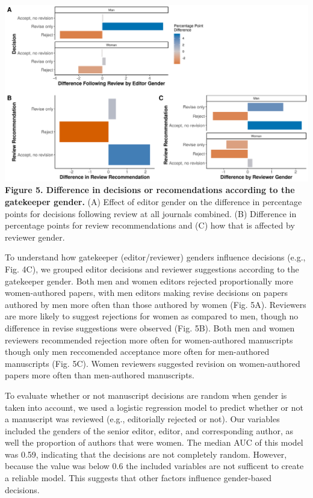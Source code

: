 \documentclass[11pt,]{article}
\begin{document}
\includegraphics{Figure_5.png} \textbf{Figure 5. Difference in decisions
or recomendations according to the gatekeeper gender.} (A) Effect of
editor gender on the difference in percentage points for decisions
following review at all journals combined. (B) Difference in percentage
points for review recommendations and (C) how that is affected by
reviewer gender.

To understand how gatekeeper (editor/reviewer) genders influence
decisions (e.g., Fig. 4C), we grouped editor decisions and reviewer
suggestions according to the gatekeeper gender. Both men and women
editors rejected proportionally more women-authored papers, with men
editors making revise decisions on papers authored by men more often
than those authored by women (Fig. 5A). Reviewers are more likely to
suggest rejections for women as compared to men, though no difference in
revise suggestions were observed (Fig. 5B). Both men and women reviewers
recommended rejection more often for women-authored manuscripts though
only men reccomended acceptance more often for men-authored manuscripts
(Fig. 5C). Women reviewers suggested revision on women-authored papers
more often than men-authored manuscripts.

To evaluate whether or not manuscript decisions are random when gender
is taken into account, we used a logistic regression model to predict
whether or not a manuscript was reviewed (e.g., editorially rejected or
not). Our variables included the genders of the senior editor, editor,
and corresponding author, as well the proportion of authors that were
women. The median AUC of this model was 0.59, indicating that the
decisions are not completely random. However, because the value was
below 0.6 the included variables are not sufficent to create a reliable
model. This suggests that other factors influence gender-based
decisions.
\end{document}
